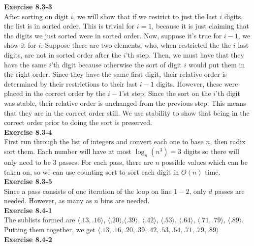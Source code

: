 \documentclass{article}
\begin{document}
\noindent\textbf{Exercise 8.3-3}\\

After sorting on digit $i$, we will show that if we restrict to just the last $i$ digits, the list is in sorted order. This is trivial for $i=1$, because it is just claiming that the digits we just sorted were in sorted order. Now, suppose it's true for $i-1$, we show it for $i$. Suppose there are two elements, who, when restricted the the $i$ last digits, are not in sorted order after the $i$'th step. Then, we must have that they have the same $i$'th digit because otherwise the sort of digit $i$ would put them in the right order. Since they have the same first digit, their relative order is determined by their restrictions to their last $i-1$ digits. However, these were placed in the correct order by the $i-1$'st step. Since the sort on the $i$'th digit was stable, their relative order is unchanged from the previous step. This means that they are in the correct order still. We use stability to show that being in the correct order prior to doing the sort is preserved.\\

\noindent\textbf{Exercise 8.3-4}\\

First run through the list of integers and convert each one to base $n$, then radix sort them.  Each number will have at most $\log_n(n^3) = 3$ digits so there will only need to be 3 passes. For each pass, there are $n$ possible values which can be taken on, so we can use counting sort to sort each digit in $O(n)$ time.\\

\noindent\textbf{Exercise 8.3-5}\\

Since a pass consists of one iteration of the loop on line $1-2$, only $d$ passes are needed. However, as many as $n$ bins are needed.\\

\noindent\textbf{Exercise 8.4-1}\\

The sublists formed are $\langle .13, .16\rangle$, $\langle .20\rangle$,$\langle .39\rangle$, $\langle .42\rangle$, $\langle .53\rangle$, $\langle .64\rangle$, $\langle .71, .79\rangle$, $\langle .89\rangle$. Putting them together, we get $\langle .13,.16,.20,.39,.42,.53,.64,.71,.79,.89 \rangle$\\

\noindent\textbf{Exercise 8.4-2}\\
\end{document}
